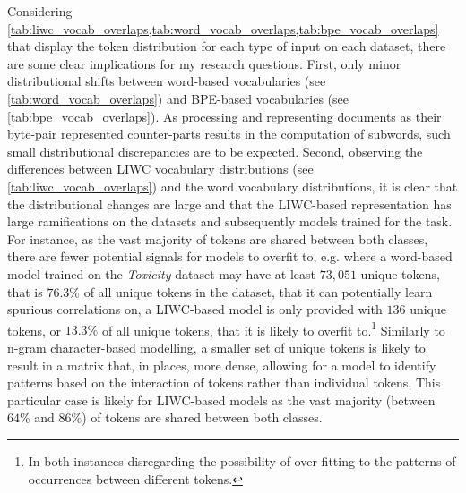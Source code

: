 \begin{table}[h]
\centering
{}
\caption{Number of unique BPE tokens in each class for each dataset and the size of their intersection.}
\label{tab:bpe_vocab_overlaps}
\end{table}

Considering \cref{tab:liwc_vocab_overlaps,tab:word_vocab_overlaps,tab:bpe_vocab_overlaps} that display the token distribution for each type of input on each dataset, there are some clear implications for my research questions.
First, only minor distributional shifts between word-based vocabularies (see \cref{tab:word_vocab_overlaps}) and BPE-based vocabularies (see \cref{tab:bpe_vocab_overlaps}). As processing and representing documents as their byte-pair represented counter-parts results in the computation of subwords, such small distributional discrepancies are to be expected.
Second, observing the differences between LIWC vocabulary distributions (see \cref{tab:liwc_vocab_overlaps}) and the word vocabulary distributions, it is clear that the distributional changes are large and that the LIWC-based representation has large ramifications on the datasets and subsequently models trained for the task.
For instance, as the vast majority of tokens are shared between both classes, there are fewer potential signals for models to overfit to, e.g. where a word-based model trained on the \textit{Toxicity} dataset may have at least $73,051$ unique tokens, that is $76.3\%$ of all unique tokens in the dataset, that it can potentially learn spurious correlations on, a LIWC-based model is only provided with $136$ unique tokens, or $13.3\%$ of all unique tokens, that it is likely to overfit to.\footnote{In both instances disregarding the possibility of over-fitting to the patterns of occurrences between different tokens.}
Similarly to n-gram character-based modelling, a smaller set of unique tokens is likely to result in a matrix that, in places, more dense, allowing for a model to identify patterns based on the interaction of tokens rather than individual tokens. This particular case is likely for LIWC-based models as the vast majority (between $64\%$ and $86\%$) of tokens are shared between both classes.

